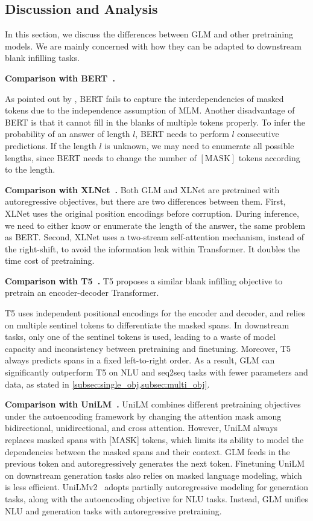 \subsection{Discussion and Analysis} In this section, we discuss the differences between GLM and other pretraining models. We are mainly concerned with how they can be adapted to downstream blank infilling tasks.

\textbf{Comparison with BERT~\cite{devlinBERT2019}.}

As pointed out by \cite{YangXLNet2019}, BERT fails to capture the interdependencies of masked tokens due to the independence assumption of MLM. Another disadvantage of BERT is that it cannot fill in the blanks of multiple tokens properly. To infer the probability of an answer of length $l$,  BERT needs to perform $l$ consecutive predictions. If the length $l$ is unknown, we may need to enumerate all possible lengths, since BERT needs to change the number of $[\text{MASK}]$ tokens according to the length.

\textbf{Comparison with XLNet~\cite{YangXLNet2019}.} Both GLM and XLNet are pretrained with autoregressive objectives, but there are two differences between them. First, XLNet uses the original position encodings before corruption. During inference, we need to either know or enumerate the length of the answer, the same problem as BERT. Second, XLNet uses a two-stream self-attention mechanism, instead of the right-shift, to avoid the information leak within Transformer. It doubles the time cost of pretraining.

\textbf{Comparison with T5~\cite{raffelT52020}.} T5 proposes a similar blank infilling objective to pretrain an encoder-decoder Transformer. 

T5 uses independent positional encodings for the encoder and decoder, and relies on multiple sentinel tokens to differentiate the masked spans. In downstream tasks, only one of the sentinel tokens is used, leading to a waste of model capacity and inconsistency between pretraining and finetuning. Moreover, T5 always predicts spans in a fixed left-to-right order. As a result, GLM can significantly outperform T5 on NLU and seq2seq tasks with fewer parameters and data, as stated in \ref{subsec:single_obj,subsec:multi_obj}.

\textbf{Comparison with UniLM~\cite{UniLM19}.} UniLM combines different pretraining objectives under the autoencoding framework by changing the attention mask among bidirectional, unidirectional, and cross attention. However, UniLM always replaces masked spans with [MASK] tokens, which limits its ability to model the dependencies between the masked spans and their context. GLM feeds in the previous token and autoregressively generates the next token. Finetuning UniLM on downstream generation tasks also relies on masked language modeling, which is less efficient. UniLMv2~\cite{UniLMv220} adopts partially autoregressive modeling for generation tasks, along with the autoencoding objective for NLU tasks. Instead, GLM unifies NLU and generation tasks with autoregressive pretraining.

